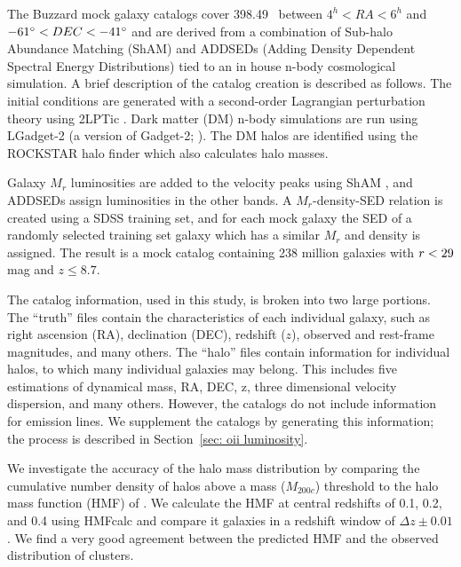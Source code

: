 \documentclass[fleqn,usenatbib]{mnras}
\begin{document}
The Buzzard mock galaxy catalogs cover 398.49 \degsq\ between $4^h< RA < 6^h$ and $-61\hbox{$^\circ$} < DEC < -41\hbox{$^\circ$}$ and are derived from a combination of Sub-halo Abundance Matching (ShAM) and ADDSEDs (Adding Density Dependent Spectral Energy Distributions) tied to an in house n-body cosmological simulation. A brief description of the catalog creation is described as follows. The initial conditions are generated with a second-order Lagrangian perturbation theory using {\sc 2LPTic} \citep{Crocce2006}. Dark matter (DM) n-body simulations are run using {\sc LGadget-2} (a version of {\sc Gadget-2}; \citealt{Springel2005}). The DM halos are identified using the {\sc ROCKSTAR} halo finder \citep{Behroozi2013} which also calculates halo masses. 

Galaxy $M_r$ luminosities are added to the velocity peaks using ShAM \citep{Reddick2013}, and ADDSEDs assign luminosities in the other bands. A $M_r$-density-SED relation is created using a SDSS training set, and for each mock galaxy the SED of a randomly selected training set galaxy which has a similar $M_r$ and density is assigned. The result is a mock catalog containing 238 million galaxies with $\hbox{$r$} < 29$ mag and $z \leq 8.7$.

The catalog information, used in this study, is broken into two large portions. The ``truth'' files contain the characteristics of each individual galaxy, such as right ascension (RA), declination (DEC), redshift ($z$), observed and rest-frame magnitudes, and many others. The ``halo'' files contain information for individual halos, to which many individual galaxies may belong. This includes five estimations of dynamical mass, RA, DEC, z, three dimensional velocity dispersion, and many others. However, the catalogs do not include information for emission lines. We supplement the catalogs by generating this information; the process is described in Section~\ref{sec: oii luminosity}.


We investigate the accuracy of the halo mass distribution by comparing the cumulative number density of halos above a mass ($M_{200c}$) threshold to the halo mass function (HMF) of \cite{Tinker2008}. We calculate the HMF at central redshifts of 0.1, 0.2, and 0.4 using {\sc HMFcalc} \citep{Murray2013} and compare it galaxies in a redshift window of $\Delta z\pm0.01$. We find a very good agreement between the predicted HMF and the observed distribution of clusters.
\end{document}
